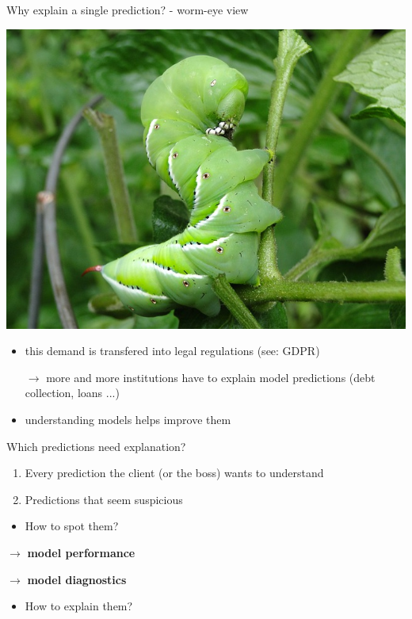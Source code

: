 \documentclass[xcolor={dvipsnames}]{beamer}
\begin{document}
	
	\begin{frame}{Why explain a single prediction? - worm-eye view}
	
	\includegraphics[scale=0.2]{ilustracje_erum/worm.jpg}
	
	\begin{itemize}
		
		\item this demand is transfered into legal regulations (see: GDPR)
		
		 $\rightarrow$ more and more institutions have to explain model predictions
		(debt collection, loans ...)
		
		\item understanding models helps improve them
	\end{itemize}
\end{frame}


\begin{frame}{Which predictions need explanation?}
	
	\begin{enumerate}
		\item Every prediction the client (or the boss) wants to understand
		
		\item Predictions that seem suspicious
	\end{enumerate}

	
	\begin{itemize}
		\item How to spot them?
	\end{itemize}
	$\rightarrow$ \textbf{model performance}
	
	$\rightarrow$ \textbf{model diagnostics}
	
	\begin{itemize}
		\item How to explain them?
	\end{itemize}
\end{frame}
\end{document}
